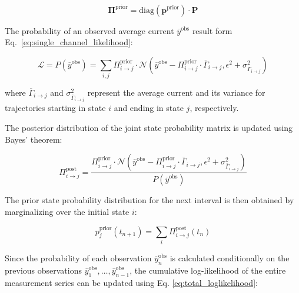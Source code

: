 \documentclass[pdflatex,sn-mathphys-num]{sn-jnl}%
\theoremstyle{thmstyleone}%
\theoremstyle{thmstyletwo}%
\theoremstyle{thmstylethree}%
\begin{document}
\begin{equation}
	\boldsymbol{\Pi}^{\text{prior}} = \mathrm{diag}(\boldsymbol{p}^{\text{prior}}) \cdot \mathbf{P}
	\label{eq:joint_state_probability_matrix}
\end{equation}

The probability of an observed average current \( \overline{y}^{\text{obs}} \) result form Eq.~\ref{eq:single_channel_likelihood}:

\begin{equation}
	\mathcal{L}=P(\overline{y}^{\text{obs}}) = \sum_{i, j} \Pi_{i \rightarrow j}^{\text{prior}} \cdot \mathcal{N}\left(\overline{y}^{\text{obs}} - \Pi_{i \rightarrow j}^{\text{prior}} \cdot \overline{\Gamma}_{i \rightarrow j}, \epsilon^2 + \sigma^2_{\overline{\Gamma}_{i \rightarrow j}}\right)
	\label{eq:single_channel_integrated_likelihood}
\end{equation}

where \( \overline{\Gamma}_{i \rightarrow j} \) and \( \sigma^2_{\overline{\Gamma}_{i \rightarrow j}} \) represent the average current and its variance for trajectories starting in state \( i \) and ending in state \( j \), respectively.

The posterior distribution of the joint state probability matrix is updated using Bayes' theorem:

\begin{equation}
	\Pi_{i \rightarrow j}^{\text{post}} = \frac{\Pi_{i \rightarrow j}^{\text{prior}} \cdot \mathcal{N}\left(\overline{y}^{\text{obs}} - \Pi_{i \rightarrow j}^{\text{prior}} \cdot \overline{\Gamma}_{i \rightarrow j}, \epsilon^2 + \sigma^2_{\overline{\Gamma}_{i \rightarrow j}}\right)}{P(\overline{y}^{\text{obs}})}
\end{equation}

The prior state probability distribution for the next interval is then obtained by marginalizing over the initial state \( i \):

\begin{equation}
	p_j^{\text{prior}}(t_{n+1}) = \sum_i \Pi_{i \rightarrow j}^{\text{post}}(t_n)
\end{equation}

Since the probability of each observation \( \overline{y}_n^{\text{obs}} \) is calculated conditionally on the previous observations \( \overline{y}_1^{\text{obs}}, \dots, \overline{y}_{n-1}^{\text{obs}} \), the cumulative log-likelihood of the entire measurement series can be updated using Eq. \ref{eq:total_loglikelihood}:
\end{document}
